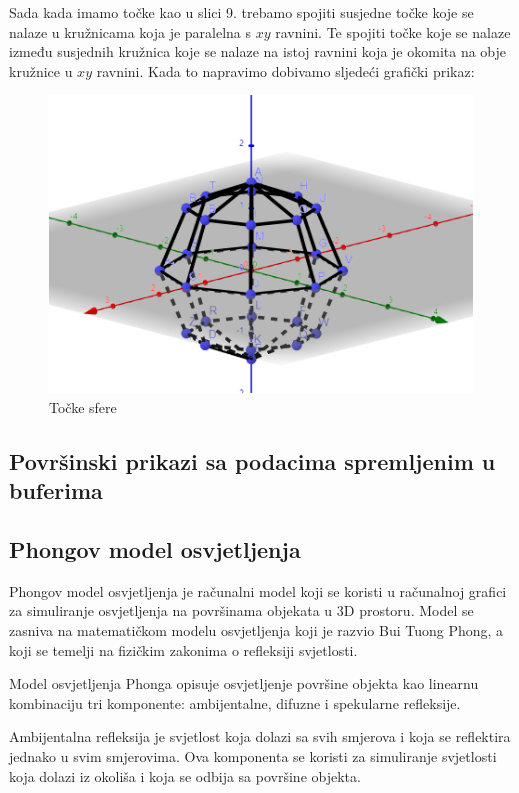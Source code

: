 \documentclass[a4paper,12pt]{article}
\begin{document}
Sada kada imamo točke kao u slici 9. trebamo spojiti susjedne točke koje se nalaze u kružnicama koja je paralelna s $xy$ ravnini.
Te spojiti točke koje se nalaze između susjednih kružnica koje se nalaze na istoj ravnini koja je okomita na obje kružnice u $xy$ ravnini.
Kada to napravimo dobivamo sljedeći grafički prikaz:

\begin{figure}[ht]
    \centering
    \includegraphics[scale=1]{image/zadatak2_sfera_geo.png}
    \caption{Točke sfere}
    
\end{figure}
\pagebreak

\subsection{Površinski prikazi sa podacima spremljenim u buferima}

\clearpage
\subsection{Phongov model osvjetljenja}
Phongov model osvjetljenja je računalni model koji se koristi u računalnoj grafici za simuliranje osvjetljenja na površinama objekata u 3D prostoru. Model se zasniva na matematičkom modelu osvjetljenja koji je razvio Bui Tuong Phong, a koji se temelji na fizičkim zakonima o refleksiji svjetlosti.

Model osvjetljenja Phonga opisuje osvjetljenje površine objekta kao linearnu kombinaciju tri komponente: ambijentalne, difuzne i spekularne refleksije.

Ambijentalna refleksija je svjetlost koja dolazi sa svih smjerova i koja se reflektira jednako u svim smjerovima. Ova komponenta se koristi za simuliranje svjetlosti koja dolazi iz okoliša i koja se odbija sa površine objekta.
\end{document}
